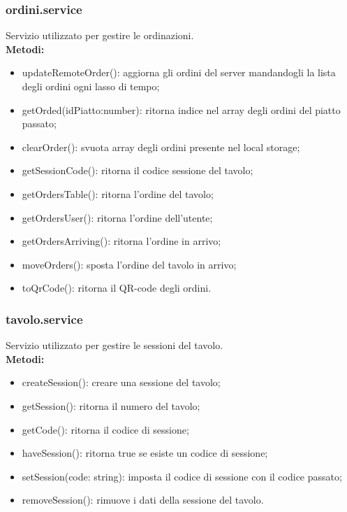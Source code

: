 \subsubsection{ordini.service}
Servizio utilizzato per gestire le ordinazioni.\\
\textbf{Metodi:}
\begin{itemize}
    \item updateRemoteOrder(): aggiorna gli ordini del server mandandogli la lista degli ordini ogni lasso di tempo;
    \item getOrded(idPiatto:number): ritorna indice nel array degli ordini del piatto passato;
    \item clearOrder(): svuota array degli ordini presente nel local storage;
    \item getSessionCode(): ritorna il codice sessione del tavolo;
    \item getOrdersTable(): ritorna l'ordine del tavolo;
    \item getOrdersUser(): ritorna l'ordine dell'utente;
    \item getOrdersArriving(): ritorna l'ordine in arrivo;
    \item moveOrders(): sposta l'ordine del tavolo in arrivo;
    \item toQrCode(): ritorna il QR-code degli ordini.
\end{itemize}

\subsubsection{tavolo.service}
Servizio utilizzato per gestire le sessioni del tavolo.\\
\textbf{Metodi:}
\begin{itemize}
    \item createSession(): creare una sessione del tavolo;
    \item getSession(): ritorna il numero del tavolo;
    \item getCode(): ritorna il codice di sessione;
    \item haveSession(): ritorna true se esiste un codice di sessione;
    \item setSession(code: string): imposta il codice di sessione con il codice passato;
    \item removeSession(): rimuove i dati della sessione del tavolo.
\end{itemize}


